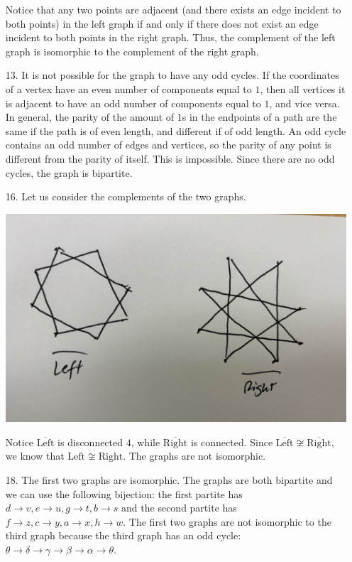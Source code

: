 \documentclass{article}
\begin{document}
\begin{enumerate}
		Notice that any two points are adjacent (and there exists an edge incident to both points) in the left graph if and only if there does not exist an edge incident to both points in the right graph. Thus, the complement of the left graph is isomorphic to the complement of the right graph.

	\item[13.]
		It is not possible for the graph to have any odd cycles. If the coordinates of a vertex have an even number of components equal to $1$, then all vertices it is adjacent to have an odd number of components equal to $1$, and vice versa. In general, the parity of the amount of $1$s in the endpoints of a path are the same if the path is of even length, and different if of odd length. An odd cycle contains an odd number of edges and vertices, so the parity of any point is different from the parity of itself. This is impossible. Since there are no odd cycles, the graph is bipartite. 

	\item[16.]
		Let us consider the complements of the two graphs.
		
		\begin{center}
			\includegraphics[width=0.8\linewidth]{IMG_3375.jpeg}
		\end{center}

		Notice $\overline{\mathrm{Left}}$ is disconnected $4$, while $\overline{\mathrm{Right}}$ is connected. Since $\overline{\mathrm{Left}}\not\cong \overline{\mathrm{Right}}$, we know that $\mathrm{Left}\not\cong \mathrm{Right}$. The graphs are not isomorphic.

	\item[18.]
		The first two graphs are isomorphic. The graphs are both bipartite and we can use the following bijection: the first partite has $d\to v, e\to u, g\to t, b\to s$ and the second partite has $f\to z, c\to y, a\to x, h\to w$. The first two graphs are not isomorphic to the third graph because the third graph has an odd cycle: $\theta\to\delta\to\gamma\to\beta\to\alpha\to\theta$.



\end{enumerate}
\end{document}
